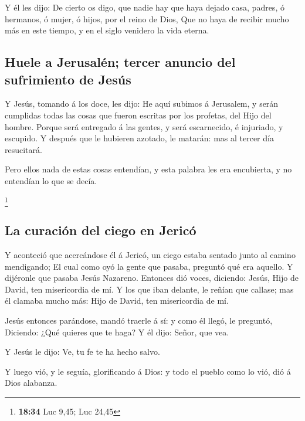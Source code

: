  Y él les dijo: De cierto os digo, que nadie hay que haya
dejado casa, padres, ó hermanos, ó mujer, ó hijos, por el reino de Dios,
 Que no haya de recibir mucho más en este tiempo, y en el
siglo venidero la vida eterna.

\hypertarget{huele-a-jerusaluxe9n-tercer-anuncio-del-sufrimiento-de-jesuxfas}{%
\subsection{Huele a Jerusalén; tercer anuncio del sufrimiento de
Jesús}\label{huele-a-jerusaluxe9n-tercer-anuncio-del-sufrimiento-de-jesuxfas}}

 Y Jesús, tomando á los doce, les dijo: He aquí subimos á
Jerusalem, y serán cumplidas todas las cosas que fueron escritas por los
profetas, del Hijo del hombre.  Porque será entregado á las
gentes, y será escarnecido, é injuriado, y escupido.  Y
después que le hubieren azotado, le matarán: mas al tercer día
resucitará.

 Pero ellos nada de estas cosas entendían, y esta palabra
les era encubierta, y no entendían lo que se decía.

\footnote{\textbf{18:34} Luc 9,45; Luc 24,45}

\hypertarget{la-curaciuxf3n-del-ciego-en-jericuxf3}{%
\subsection{La curación del ciego en
Jericó}\label{la-curaciuxf3n-del-ciego-en-jericuxf3}}

 Y aconteció que acercándose él á Jericó, un ciego estaba
sentado junto al camino mendigando;  El cual como oyó la
gente que pasaba, preguntó qué era aquello.  Y dijéronle
que pasaba Jesús Nazareno.  Entonces dió voces, diciendo:
Jesús, Hijo de David, ten misericordia de mí.  Y los que
iban delante, le reñían que callase; mas él clamaba mucho más: Hijo de
David, ten misericordia de mí.

 Jesús entonces parándose, mandó traerle á sí: y como él
llegó, le preguntó,  Diciendo: ¿Qué quieres que te haga? Y
él dijo: Señor, que vea.

 Y Jesús le dijo: Ve, tu fe te ha hecho salvo.

 Y luego vió, y le seguía, glorificando á Dios: y todo el
pueblo como lo vió, dió á Dios alabanza.

